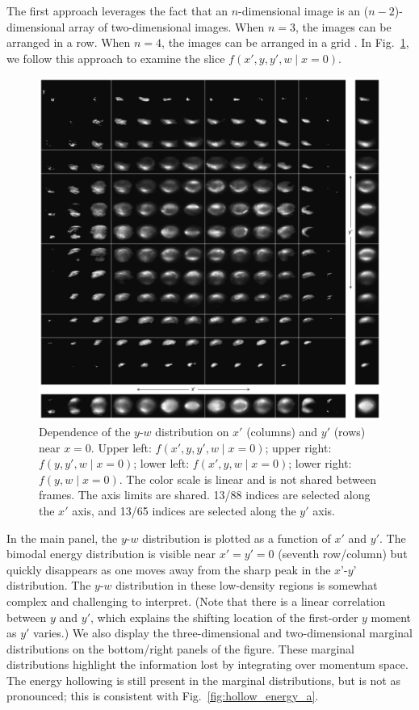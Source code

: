\documentclass[%
 reprint,
 amsmath,amssymb,
 aps,
prstab,
]{revtex4-2}
\begin{document}
The first approach leverages the fact that an $n$-dimensional image is an ($n-2$)-dimensional array of two-dimensional images. When $n = 3$, the images can be arranged in a row. When $n = 4$, the images can be arranged in a grid \cite{Ruisard2020}. In Fig.~\ref{fig:matrix_slice_xpyp_view_yw}, we follow this approach to examine the slice $f(x', y, y', w \mid x{=}0)$.
%
\begin{figure}[]
    \centering
    \includegraphics[width=\textwidth]{fig_matrix_slice_x'-y'_view_w-y.pdf}
    \caption{Dependence of the $y$-$w$ distribution on $x'$ (columns) and $y'$ (rows) near $x = 0$. Upper left: $f(x', y, y', w \mid x{=}0)$; upper right: $f(y, y', w \mid x{=}0)$; lower left: $f(x', y, w \mid x{=}0)$; lower right: $f(y, w \mid x{=}0)$. The color scale is linear and is not shared between frames. The axis limits are shared. 13/88 indices are selected along the $x'$ axis, and 13/65 indices are selected along the $y'$ axis.}
    \label{fig:matrix_slice_xpyp_view_yw}
\end{figure}
%
In the main panel, the $y$-$w$ distribution is plotted as a function of $x'$ and $y'$. The bimodal energy distribution is visible near $x'=y'=0$ (seventh row/column) but quickly disappears as one moves away from the sharp peak in the $x’$-$y’$ distribution. The $y$-$w$ distribution in these low-density regions is somewhat complex and challenging to interpret. (Note that there is a linear correlation between $y$ and $y'$, which explains the shifting location of the first-order $y$ moment as $y'$ varies.) We also display the three-dimensional and two-dimensional marginal distributions on the bottom/right panels of the figure. These marginal distributions highlight the information lost by integrating over momentum space. The energy hollowing is still present in the marginal distributions, but is not as pronounced; this is consistent with Fig.~\ref{fig:hollow_energy_a}.
\end{document}
